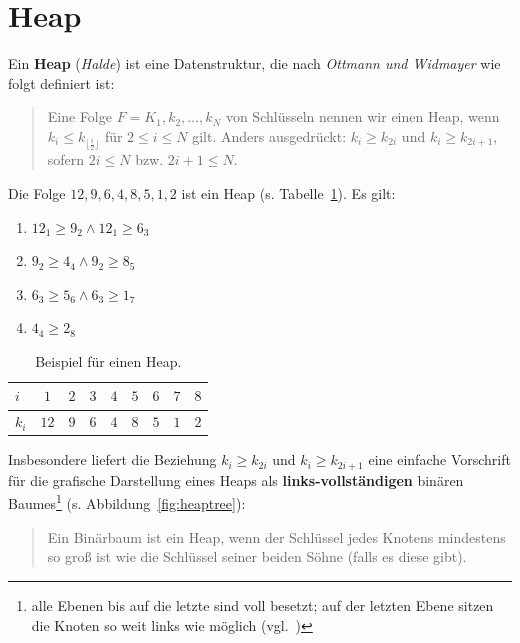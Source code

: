 \section{Heap}\label{sec:heap}

Ein \textbf{Heap} (\textit{Halde}) ist eine Datenstruktur, die nach \textit{Ottmann und Widmayer} wie folgt definiert ist:

\blockquote[{\cite[106]{OW17b}}]{
Eine Folge $F = K_1, k_2, \ldots,k_N$ von Schlüsseln nennen wir einen Heap, wenn $k_i \leq k_{\lfloor \frac{i}{2} \rfloor}$ für $2 \leq i \leq N$ gilt. Anders ausgedrückt: $k_i \geq k_{2i}$ und $k_i \geq k_{2i+1}$, sofern $2i \leq N$ bzw. $2i + 1 \leq N$.
}

\noindent
Die Folge $12, 9, 6, 4, 8, 5, 1, 2$ ist ein Heap (s. Tabelle~\ref{tab:heap}).
Es gilt:

\begin{enumerate}
    \item $12_1 \geq 9_2 \land 12_1 \geq 6_3$
    \item $9_2 \geq 4_4 \land 9_2 \geq 8_5$
    \item $6_3 \geq 5_6 \land 6_3 \geq 1_7$
    \item $4_4 \geq 2_8$
\end{enumerate}


\setlength{\tabcolsep}{1.5em}
\renewcommand{\arraystretch}{1.5}%
\begin{table} %
    \centering
    \begin{tabular}{|l | c | c | c| c| c | c| c | c|}
        \hline
        $i$ & $1$ &  $2$ &  $3$ &  $4$ &  $5$ &  $6$ &  $7$ &  $8$  \\
        \hline
        $k_i$ & $12$ &  $9$ &  $6$ &  $4$ &  $8$ &  $5$ &  $1$ &  $2$  \\
        \hline
    \end{tabular}
    \caption{Beispiel für einen Heap.}
    \label{tab:heap}
\end{table}

\noindent
Insbesondere liefert die Beziehung $k_i \geq k_{2i}$ und $k_i \geq k_{2i+1}$ eine einfache Vorschrift für die grafische Darstellung eines Heaps als \textbf{links-vollständigen} binären Baumes\footnote{
alle Ebenen bis auf die letzte sind voll besetzt; auf der letzten Ebene sitzen die Knoten so weit links wie möglich (vgl.~\cite[154]{GD18d})
} (s. Abbildung~\ref{fig:heaptree}):

\blockquote[{\cite[107]{OW17b}}]{
   Ein Binärbaum ist ein Heap, wenn der Schlüssel jedes Knotens mindestens so groß ist wie die Schlüssel seiner beiden Söhne (falls es diese gibt).
}

